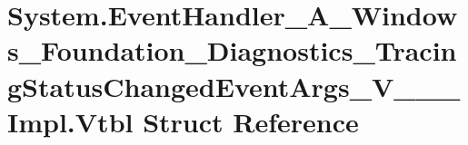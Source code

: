 \hypertarget{struct_system_1_1_event_handler___a___windows___foundation___diagnostics___tracing_status_changedfe64b3ab054bcd8e33973c4cffad16b}{}\section{System.\+Event\+Handler\+\_\+\+A\+\_\+\+Windows\+\_\+\+Foundation\+\_\+\+Diagnostics\+\_\+\+Tracing\+Status\+Changed\+Event\+Args\+\_\+\+V\+\_\+\+\_\+\+\_\+\+Impl.\+Vtbl Struct Reference}
\label{struct_system_1_1_event_handler___a___windows___foundation___diagnostics___tracing_status_changedfe64b3ab054bcd8e33973c4cffad16b}
